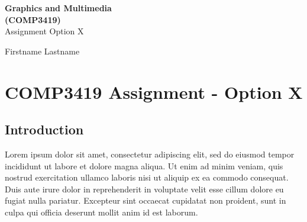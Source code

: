 \documentclass[11pt,fleqn,openany]{book} %
\begin{document}

\begingroup
\thispagestyle{empty}
\centering
\vspace*{5cm}
\par\normalfont\fontsize{35}{35}\sffamily\selectfont
\textbf{\color{black}Graphics and Multimedia\\(COMP3419)}\\

{\LARGE Assignment Option X}\par %
{\LARGE Firstname Lastname}\par %
\endgroup


\chapter{COMP3419 Assignment - Option X}

\section{Introduction}
Lorem ipsum dolor sit amet, consectetur adipiscing elit, sed do eiusmod tempor incididunt ut labore et dolore magna aliqua. Ut enim ad minim veniam, quis nostrud exercitation ullamco laboris nisi ut aliquip ex ea commodo consequat. Duis aute irure dolor in reprehenderit in voluptate velit esse cillum dolore eu fugiat nulla pariatur. Excepteur sint occaecat cupidatat non proident, sunt in culpa qui officia deserunt mollit anim id est laborum.
\end{document}
